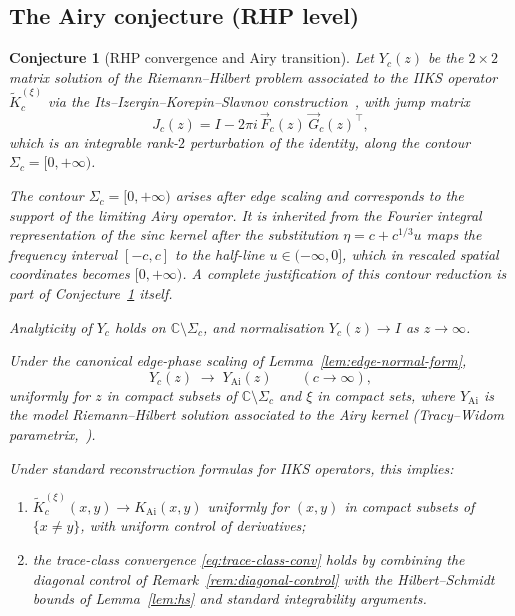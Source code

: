 \documentclass[12pt,a4paper]{amsart}
\newtheorem{conjecture}[theorem]{Conjecture}
\theoremstyle{definition}
\theoremstyle{remark}
\begin{document}
\subsection{The Airy conjecture (RHP level)}

\begin{conjecture}[RHP convergence and Airy transition]
\label{conj:airy-transition}
Let $Y_c(z)$ be the $2\times 2$ matrix solution of the
Riemann--Hilbert problem associated to the IIKS operator
$\widetilde{K}_c^{(\xi)}$ via the Its--Izergin--Korepin--Slavnov
construction~\cite{ItsIzergin1990}, with jump matrix
\begin{equation}\label{eq:jump-matrix}
  J_c(z) = I - 2\pi i\,\vec{F}_c(z)\,\vec{G}_c(z)^\top,
\end{equation}
which is an integrable rank-$2$ perturbation of the identity,
along the contour $\Sigma_c = [0,+\infty)$.

The contour $\Sigma_c=[0,+\infty)$ arises after edge scaling
and corresponds to the support of the limiting Airy operator.
It is inherited from the Fourier integral representation of the sinc
kernel after the substitution $\eta = c + c^{1/3}u$ maps the
frequency interval $[-c,c]$ to the half-line $u \in (-\infty,0]$,
which in rescaled spatial coordinates becomes $[0,+\infty)$.
A complete justification of this contour reduction is part of
Conjecture~\ref{conj:airy-transition} itself.

Analyticity of $Y_c$ holds on $\mathbb{C}\setminus\Sigma_c$,
and normalisation $Y_c(z)\to I$ as $z\to\infty$.

Under the canonical edge-phase scaling of Lemma~\ref{lem:edge-normal-form},
\begin{equation}\label{eq:rhp-convergence}
  Y_c(z) \;\longrightarrow\; Y_{\mathrm{Ai}}(z)
  \qquad (c\to\infty),
\end{equation}
uniformly for $z$ in compact subsets of $\mathbb{C}\setminus\Sigma_c$
and $\xi$ in compact sets, where $Y_{\mathrm{Ai}}$ is the model
Riemann--Hilbert solution associated to the Airy kernel
(Tracy--Widom parametrix,~\cite{TraWid1994}).

Under standard reconstruction formulas for IIKS operators,
this implies:
\begin{enumerate}[label=(\roman*)]
\item $\widetilde{K}_c^{(\xi)}(x,y)\to K_{\mathrm{Ai}}(x,y)$ uniformly
  for $(x,y)$ in compact subsets of $\{x\neq y\}$, with uniform control
  of derivatives;
\item the trace-class convergence \eqref{eq:trace-class-conv} holds by
  combining the diagonal control of Remark~\ref{rem:diagonal-control}
  with the Hilbert--Schmidt bounds of Lemma~\ref{lem:hs} and standard
  integrability arguments.
\end{enumerate}
\end{conjecture}
\end{document}
